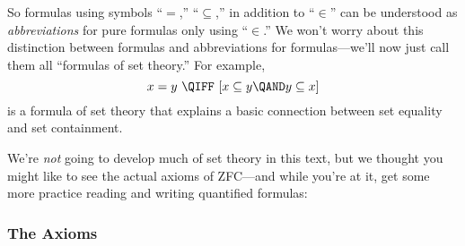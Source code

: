 So formulas using symbols ``$=$,'' ``$\subseteq$,'' in addition to
``$\in$'' can be understood as \emph{abbreviations} for pure formulas
only using ``$\in$.''  We won't worry about this distinction between
formulas and abbreviations for formulas---we'll now just call them all
``formulas of set theory.''  For example,
\[
x= y\ \QIFF\ [x \subseteq y \QAND y \subseteq x]
\]
is a formula of set theory that explains a basic connection between
set equality and set containment.


We're \emph{not} going to develop much of set theory in this text, but
we thought you might like to see the actual axioms of ZFC---and while
you're at it, get some more practice reading and writing quantified
formulas: 

\subsubsection{The Axioms}

